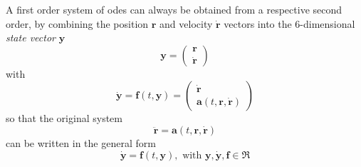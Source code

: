 A first order system of \glspl{ode} can always be obtained from a respective second 
order, by combining the position $\bm{r}$ and velocity $\bm{\dot{r}}$ vectors into 
the 6-dimensional \emph{state vector} $\bm{y}$
\begin{equation}
    \bm{y} = \begin{pmatrix}\bm{r}\\ \bm{\dot{r}} \end{pmatrix}
\end{equation}
with 
\begin{equation}
    \bm{\dot{y}} = \bm{f}(t,\bm{y}) = \begin{pmatrix}\bm{\dot{r}} \\ \bm{a}(t, \bm{r}, \bm{\dot{r}}) \end{pmatrix}
\end{equation}
so that the original system
\begin{equation}
    \bm{\ddot{r}} = \bm{a}(t, \bm{r}, \bm{\dot{r}})
\end{equation}
can be written in the general form
\begin{equation}
    \bm{\dot{y}} = \bm{f}(t,\bm{y}), \text{ with } \bm{y}, \bm{\dot{y}}, \bm{f} \in \Re
\end{equation}
